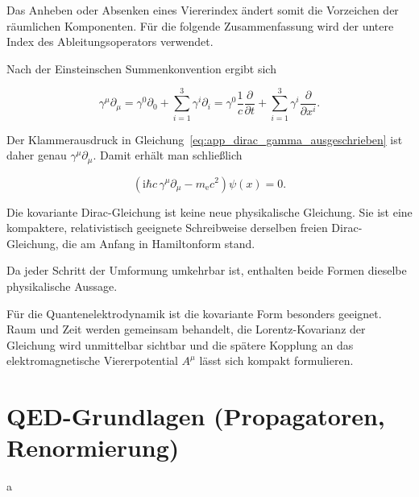 Das Anheben oder Absenken eines Viererindex ändert somit die Vorzeichen
der räumlichen Komponenten. Für die folgende Zusammenfassung wird der
untere Index des Ableitungsoperators verwendet.

Nach der Einsteinschen Summenkonvention ergibt sich

\begin{equation}
	\gamma^\mu\partial_\mu
	=
	\gamma^0\partial_0
	+
	\sum_{i=1}^{3}\gamma^i\partial_i
	=
	\gamma^0\frac{1}{c}\frac{\partial}{\partial t}
	+
	\sum_{i=1}^{3}\gamma^i\frac{\partial}{\partial x^i}.
	\label{eq:app_gamma_viererableitung_dirac}
\end{equation}

Der Klammerausdruck in
Gleichung~\eqref{eq:app_dirac_gamma_ausgeschrieben} ist daher genau
\(\gamma^\mu\partial_\mu\). Damit erhält man schließlich

\begin{equation}
	\boxed{
		\left(
		\mathrm{i}\hbar c\,\gamma^\mu\partial_\mu
		-
		m_{\mathrm e}c^2
		\right)
		\psi(x)
		=
		0
	}.
	\label{eq:app_diracgleichung_kovariante_form}
\end{equation}

\begin{DidacticBox}
	\label{box:app_diracgleichung_gleiche_dynamik}
	Die kovariante Dirac-Gleichung ist keine neue physikalische Gleichung.
	Sie ist eine kompaktere, relativistisch geeignete Schreibweise derselben
	freien Dirac-Gleichung, die am Anfang in Hamiltonform stand.

	Da jeder Schritt der Umformung umkehrbar ist, enthalten beide Formen
	dieselbe physikalische Aussage.
\end{DidacticBox}

Für die Quantenelektrodynamik ist die kovariante Form besonders geeignet.
Raum und Zeit werden gemeinsam behandelt, die Lorentz-Kovarianz der
Gleichung wird unmittelbar sichtbar und die spätere Kopplung an das
elektromagnetische Viererpotential \(A^\mu\) lässt sich kompakt
formulieren.

\section{QED-Grundlagen (Propagatoren, Renormierung)}
a
